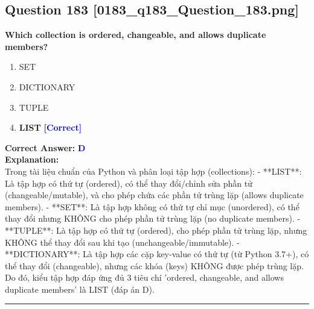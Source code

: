 \documentclass[11pt,a4paper]{article}
\begin{document}
\begin{minipage}{\textwidth}
\subsection*{Question 183 \quad \footnotesize{[0183_q183_Question_183.png]}}
\noindent \textbf{Which collection is ordered, changeable, and allows duplicate members?}

\begin{enumerate}[label=\Alph*.]
    \item SET
    \item DICTIONARY
    \item TUPLE
    \item \textbf{LIST} \hfill \textcolor{blue}{\textbf{[Correct]}}
\end{enumerate}

\noindent \textbf{Correct Answer:} \textcolor{blue}{\textbf{D}} \\[4pt]
\noindent \textbf{Explanation:}\\
Trong tài liệu chuẩn của Python và phân loại tập hợp (collections):\newline
- **LIST**: Là tập hợp có thứ tự (ordered), có thể thay đổi/chỉnh sửa phần tử (changeable/mutable), và cho phép chứa các phần tử trùng lặp (allows duplicate members).\newline
- **SET**: Là tập hợp không có thứ tự chỉ mục (unordered), có thể thay đổi nhưng KHÔNG cho phép phần tử trùng lặp (no duplicate members).\newline
- **TUPLE**: Là tập hợp có thứ tự (ordered), cho phép phần tử trùng lặp, nhưng KHÔNG thể thay đổi sau khi tạo (unchangeable/immutable).\newline
- **DICTIONARY**: Là tập hợp các cặp key-value có thứ tự (từ Python 3.7+), có thể thay đổi (changeable), nhưng các khóa (keys) KHÔNG được phép trùng lặp.\newline
Do đó, kiểu tập hợp đáp ứng đủ 3 tiêu chí 'ordered, changeable, and allows duplicate members' là LIST (đáp án D).
\end{minipage}
\vspace{0.8cm}
\hrule
\vspace{0.5cm}
\end{document}
